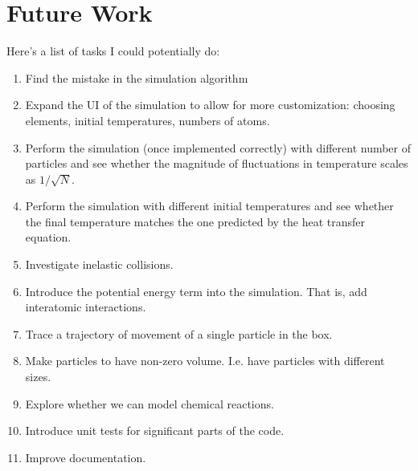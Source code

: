 \documentclass[12pt]{article}
\begin{document}
\section{Future Work}
Here's a list of tasks I could potentially do:

\begin{enumerate}
    \item Find the mistake in the simulation algorithm
    \item Expand the UI of the simulation to allow for more customization: choosing elements, initial temperatures, numbers of atoms. 
    \item Perform the simulation (once implemented correctly) with different number of particles and see whether the magnitude of fluctuations in temperature scales as $1/\sqrt{N}$.
    \item Perform the simulation with different initial temperatures and see whether the final temperature matches the one predicted by the heat transfer equation.
    \item Investigate inelastic collisions.
    \item Introduce the potential energy term into the simulation. That is, add interatomic interactions.
    \item Trace a trajectory of movement of a single particle in the box.
    \item Make particles to have non-zero volume. I.e. have particles with different sizes.
    \item Explore whether we can model chemical reactions.
    \item Introduce unit tests for significant parts of the code.
    \item Improve documentation.
\end{enumerate}
\end{document}

